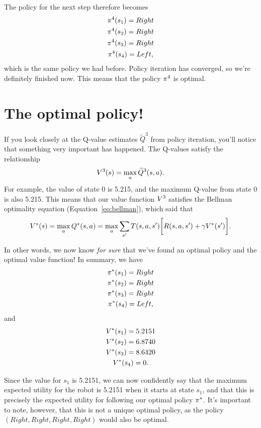 \documentclass[a4paper]{article}
\begin{document}
The policy for the next step therefore becomes
\begin{gather*}
  \pi^4(s_1) = Right \\
  \pi^4(s_2) = Right \\
  \pi^4(s_3) = Right \\
  \pi^4(s_4) = Left ,
\end{gather*}
which is the same policy we had before.
Policy iteration has converged, so we're definitely finished now.
This means that the policy $\pi^4$ is optimal.

\section{The optimal policy!}
If you look closely at the Q-value estimates $\widetilde{Q}^3$ from policy
iteration,
you'll notice that something very important has happened.
The Q-values satisfy the relationship
\begin{equation*}
  V^3(s) = \operatorname*{max}_a \widetilde{Q}^3(s, a) .
\end{equation*}
For example, the value of state 0 is 5.215, and the maximum Q-value from state
0 is also 5.215.
This means that our value function $V^3$ satisfies the Bellman optimality
equation (Equation~\ref{eq:bellman}), which said that
\begin{equation*}
  V^*(s) = \operatorname*{max}_a Q^*(s, a) = \operatorname*{max}_a \sum_{s'} T(s, a, s') \bigg[ R(s, a, s') + \gamma V^*(s') \bigg] .
\end{equation*}

In other words, we now know \emph{for sure} that we've found an optimal policy
and the optimal value function!
In summary, we have
\begin{gather*}
  \pi^*(s_1) = Right \\
  \pi^*(s_2) = Right \\
  \pi^*(s_3) = Right \\
  \pi^*(s_4) = Left ,
\end{gather*}
and
\begin{gather*}
  V^*(s_1) = 5.2151 \\
  V^*(s_2) = 6.8740 \\
  V^*(s_3) = 8.6420 \\
  V^*(s_4) = 0 .
\end{gather*}

Since the value for $s_1$ is 5.2151, we can now confidently say that
the maximum expected utility for the robot is 5.2151 when it starts at
state $s_1$, and that this is precisely the expected utility for
following our optimal policy $\pi^*$.
It's important to note, however, that this is not a unique optimal policy,
as the policy $(Right, Right, Right, Right)$ would also be optimal.
\end{document}
